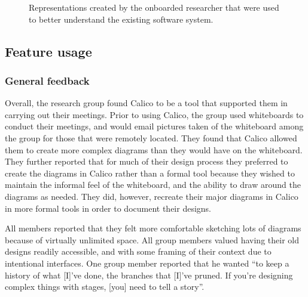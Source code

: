 \begin{figure}%
  \centering
   \caption {Representations created by the onboarded researcher that were used to better understand the existing software system.}
   \label{fig:researchgroup:2}   
\end{figure}%

\subsection{Feature usage}

\subsubsection{General feedback}

Overall, the research group found Calico to be a tool that supported them in carrying out their meetings. Prior to using Calico, the group used whiteboards to conduct their meetings, and would email pictures taken of the whiteboard among the group for those that were remotely located. They found that Calico allowed them to create more complex diagrams than they would have on the whiteboard. They further reported that for much of their design process they preferred to create the diagrams in Calico rather than a formal tool because they wished to maintain the informal feel of the whiteboard, and the ability to draw around the diagrams as needed. They did, however, recreate their major diagrams in Calico in more formal tools in order to document their designs.

All members reported that they felt more comfortable sketching lots of diagrams because of virtually unlimited space. All group members valued having their old designs readily accessible, and with some framing of their context due to intentional interfaces. One group member reported that he wanted ``to keep a history of what [I]'ve done, the branches that [I]'ve pruned. If you're designing complex things with stages, [you] need to tell a story''.

